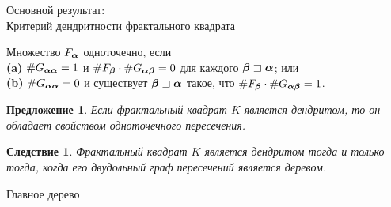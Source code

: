 \documentclass[aspectratio=1610, 10pt, notheorems]{beamer}
\newtheorem{proposition} {Предложение}
\newtheorem{corollary}   {Следствие}
\newtheorem{definition}  {Определение}
\begin{document}
\begin{frame}{Основной результат:\\Критерий дендритности фрактального квадрата}

Множество $F_{\bm{\alpha}}$ одноточечно, если \\
\textbf{(a)} $\#G_{{\bm{\alpha}}{\bm{\alpha}}}=1$ и $\#F_{\bm{\beta}}\cdot\#G_{{\bm{\alpha}}{\bm{\beta}}}=0$ для каждого ${\bm{\beta}}\sqsupset{\bm{\alpha}}$; или\\
\textbf{(b)} $\#G_{{\bm{\alpha}}{\bm{\alpha}}}=0$ и существует ${\bm{\beta}}\sqsupset{\bm{\alpha}}$ такое, что $\#F_{\bm{\beta}}\cdot\#G_{{\bm{\alpha}}{\bm{\beta}}}=1$.

\begin{proposition}
Если фрактальный квадрат $K$ является дендритом, то он обладает свойством одноточечного пересечения.
\end{proposition}
\begin{corollary}
Фрактальный квадрат $K$ является дендритом тогда и только тогда, когда его двудольный граф пересечений является деревом.
\end{corollary}
\end{frame}





\begin{frame}{Главное дерево}
\end{frame}
\end{document}
